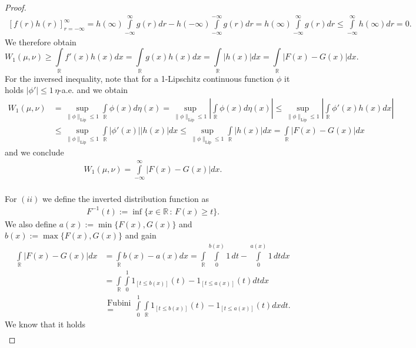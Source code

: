 \documentclass[11pt,a4paper]{article}
\begin{document}
\begin{proof}
\begin{align*}
\left[f(r)h(r)\right]_{r=-\infty}^{\infty} = h(\infty)\int\limits_{-\infty}^{\infty}g(r)dr - h(-\infty)\int\limits_{-\infty}^{-\infty}g(r)dr = h(\infty)\int\limits_{-\infty}^{\infty}g(r)dr \leq \int\limits_{-\infty}^{\infty}h(\infty)dr = 0.
\end{align*}
We therefore obtain 
\[
W_1(\mu,\nu)\geq\int\limits_{\mathbb{R}}f'(x)h(x)dx = \int\limits_{\mathbb{R}}g(x)h(x)dx = \int\limits_{\mathbb{R}}|h(x)|dx = \int\limits_{\mathbb{R}}\left|F(x)-G(x)\right|dx.
\]
For the inversed inequality, note that for a 1-Lipschitz continuous function $\phi$ it holds $|\phi'|\leq{}1\,\eta$-a.e. and we obtain
\begin{align*}
W_1(\mu,\nu)&=\sup\limits_{\|\phi\|_\text{Lip}\leq{}1}\int\limits_{\mathbb{R}}\phi(x)d\eta(x) = \sup\limits_{\|\phi\|_\text{Lip}\leq{}1}\left|\int\limits_{\mathbb{R}}\phi(x)d\eta(x)\right| \leq \sup\limits_{\|\phi\|_\text{Lip}\leq{}1}\left|\int\limits_{\mathbb{R}}\phi'(x)h(x)dx\right| \\&\leq \sup\limits_{\|\phi\|_\text{Lip}\leq{}1}\int\limits_{\mathbb{R}}|\phi'(x)||h(x)|dx \leq \sup\limits_{\|\phi\|_\text{Lip}\leq{}1}\int\limits_{\mathbb{R}}|h(x)|dx = \int\limits_{\mathbb{R}}\left|F(x)-G(x)\right|dx
\end{align*}
and we conclude 
\begin{align*}
W_1(\mu,\nu)=\int\limits_{-\infty}^{\infty}|F(x)-G(x)|dx.
\end{align*}
\vspace{1em}\\
For $(ii)$ we define the inverted distribution function as 
\begin{align*}
F^{-1}(t) := \inf\lbrace{}x\in\mathbb{R}\,:\,F(x)\geq{}t\rbrace.
\end{align*}
We also define $a(x):=\min\lbrace{}F(x),G(x)\rbrace$ and $b(x):=\max\lbrace{}F(x),G(x)\rbrace$ and gain
\begin{align*}
\int\limits_{\mathbb{R}}|F(x)-G(x)|dx &= \int\limits_{\mathbb{R}}b(x)-a(x)dx = \int\limits_{\mathbb{R}}\int\limits_{0}^{b(x)}1\,dt - \int\limits_{0}^{a(x)}1\,dtdx \\& = \int\limits_{\mathbb{R}}\int\limits_{0}^{1}1_{[t\leq{}b(x)]}(t) - 1_{[t\leq{}a(x)]}(t) dtdx \\& \substack{\text{Fubini}\\=} \int\limits_{0}^{1}\int\limits_{\mathbb{R}} 1_{[t\leq{}b(x)]}(t) - 1_{[t\leq{}a(x)]}(t) dxdt.  
\end{align*}
We know that it holds
\begin{align*}

\end{align*}
\end{proof}
\end{document}
